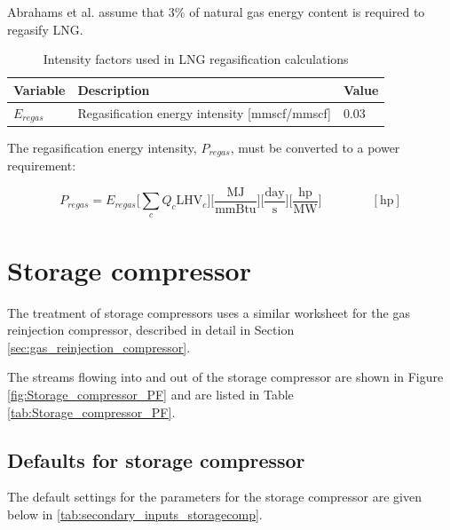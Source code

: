\documentclass[11pt]{report}
\newcommand{\eqnunit}[1]{\quad\quad \scriptstyle{\left[\text{#1}\right]}}
\begin{document}
Abrahams et al. \cite{abrahams2015} assume that 3\% of natural gas energy content is required to regasify LNG.

\begin{table}[h]
\begin{scriptsize}
\caption{Intensity factors used in LNG regasification calculations}
\label{tab:regas}
\begin{tabular*}{0.8\columnwidth}{p{}p{}p{}}
\toprule
Variable & Description & Value \\
\midrule
$E_{regas}$ & Regasification energy intensity [mmscf/mmscf] & 0.03 \\
\bottomrule
\end{tabular*}
\end{scriptsize}
\end{table}

The regasification energy intensity, $P_{regas}$, must be converted to a power requirement:

\begin{equation}
P_{regas} = E_{regas} \Big[\sum_c Q_{c} \textrm{LHV}_{c} \Big] \Big[\frac{\textrm{MJ}}{\textrm{mmBtu}} \Big] \Big[\frac{\textrm{day}}{\textrm{s}} \Big] \Big[\frac{\textrm{hp}}{\textrm{MW}} \Big] \quad\quad\eqnunit{hp}
\end{equation}

\clearpage

\section{Storage compressor}
\label{sec:storage_compressor}

The treatment of storage compressors uses a similar worksheet for the gas reinjection compressor, described in detail in Section \ref{sec:gas_reinjection_compressor}.

The streams flowing into and out of the storage compressor are shown in Figure \ref{fig:Storage_compressor_PF} and are listed in Table \ref{tab:Storage_compressor_PF}.

\subsection{Defaults for storage compressor}

The default settings for the parameters for the storage compressor are given below in \ref{tab:secondary_inputs_storagecomp}.
 
\end{document}
